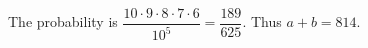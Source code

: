 The probability is $\dfrac{10\cdot9\cdot8\cdot7\cdot6}{10^5}=\dfrac{189}{625}$. Thus $\boxed{a+b=814}$.
